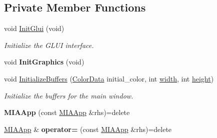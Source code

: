 \subsection*{Private Member Functions}
\begin{DoxyCompactItemize}
\item 
void \hyperlink{classimage__tools_1_1MIAApp_a73dda8b4bfb9f31c8a267774dfecdeaa}{Init\+Glui} (void)\hypertarget{classimage__tools_1_1MIAApp_a73dda8b4bfb9f31c8a267774dfecdeaa}{}\label{classimage__tools_1_1MIAApp_a73dda8b4bfb9f31c8a267774dfecdeaa}

\begin{DoxyCompactList}\small\item\em Initialize the G\+L\+UI interface. \end{DoxyCompactList}\item 
void {\bfseries Init\+Graphics} (void)\hypertarget{classimage__tools_1_1MIAApp_a3d0f36c690bcd1f3eb85c2f92da6a5b3}{}\label{classimage__tools_1_1MIAApp_a3d0f36c690bcd1f3eb85c2f92da6a5b3}

\item 
void \hyperlink{classimage__tools_1_1MIAApp_a712453910e5325d90d7d0835ac00d059}{Initialize\+Buffers} (\hyperlink{classimage__tools_1_1ColorData}{Color\+Data} initial\+\_\+color, int \hyperlink{classimage__tools_1_1BaseGfxApp_a2fe403c5392f624477c2ce4429f1a7b5}{width}, int \hyperlink{classimage__tools_1_1BaseGfxApp_aa961e13a7a8e6062204223cc33ac7503}{height})\hypertarget{classimage__tools_1_1MIAApp_a712453910e5325d90d7d0835ac00d059}{}\label{classimage__tools_1_1MIAApp_a712453910e5325d90d7d0835ac00d059}

\begin{DoxyCompactList}\small\item\em Initialize the buffers for the main window. \end{DoxyCompactList}\item 
{\bfseries M\+I\+A\+App} (const \hyperlink{classimage__tools_1_1MIAApp}{M\+I\+A\+App} \&rhs)=delete\hypertarget{classimage__tools_1_1MIAApp_a5ae3748b77cc55a1100083b02b088927}{}\label{classimage__tools_1_1MIAApp_a5ae3748b77cc55a1100083b02b088927}

\item 
\hyperlink{classimage__tools_1_1MIAApp}{M\+I\+A\+App} \& {\bfseries operator=} (const \hyperlink{classimage__tools_1_1MIAApp}{M\+I\+A\+App} \&rhs)=delete\hypertarget{classimage__tools_1_1MIAApp_a067b980221f818a3a42d11f516d666f0}{}\label{classimage__tools_1_1MIAApp_a067b980221f818a3a42d11f516d666f0}

\end{DoxyCompactItemize}
